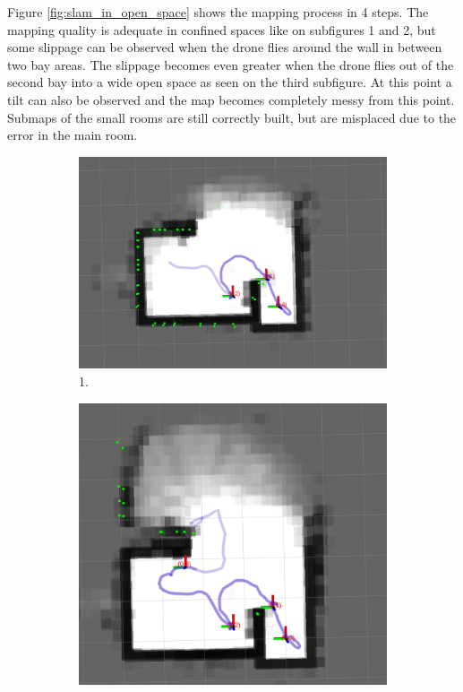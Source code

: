 Figure \ref{fig:slam_in_open_space} shows the mapping process in 4 steps. The mapping quality is adequate 
in confined spaces like on subfigures 1 and 2, but some slippage can be observed when the drone flies 
around the wall in between two bay areas. The slippage becomes even greater when the drone flies out of 
the second bay into a wide open space as seen on the third subfigure. At this point a tilt can also be 
observed and the map becomes completely messy from this point. Submaps of the small rooms are still 
correctly built, but are misplaced due to the error in the main room.

\begin{figure}[ht!]
    \centering
    \begin{subfigure}[b]{0.4\linewidth}
      \includegraphics[width=0.9\linewidth]{figures/building2_open_01.png}
       \caption{1.}
    \end{subfigure}
    \begin{subfigure}[b]{0.4\linewidth}
      \includegraphics[width=0.9\linewidth]{figures/building2_open_02.png}

\end{subfigure}
\end{figure}
